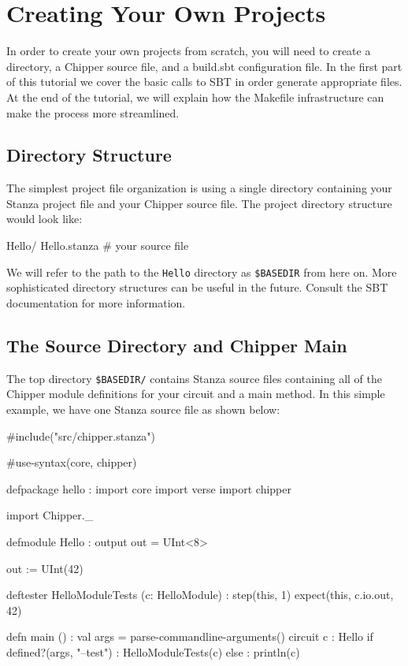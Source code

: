 \section{Creating Your Own Projects}

In order to create your own projects from scratch, you will need to create a directory, a Chipper source file, and a build.sbt configuration file. In the first part of this tutorial we cover the basic calls to SBT in order generate appropriate files. At the end of the tutorial, we will explain how the Makefile infrastructure can make the process more streamlined.

\subsection{Directory Structure}

The simplest project file organization is using a single directory containing your Stanza project file and your Chipper source file.  The project directory structure would look like:

\begin{bash}
Hello/
  Hello.stanza # your source file
\end{bash}

We will refer to the path to the \verb+Hello+ directory as \verb+$BASEDIR+ from here on.  More sophisticated directory structures can be useful in the future.  Consult the SBT documentation for more information.

\subsection{The Source Directory and Chipper Main}

The top directory \verb+$BASEDIR/+ contains Stanza source files containing all of the Chipper module definitions for your circuit and a main method.  In this simple example, we have one Stanza source file as shown below:

\begin{stanza}
#include("src/chipper.stanza")

#use-syntax(core, chipper)

defpackage hello :
   import core
   import verse
   import chipper

import Chipper._

defmodule Hello :
  output out = UInt<8>

  out := UInt(42)

deftester HelloModuleTests (c: HelloModule) :
  step(this, 1)
  expect(this, c.io.out, 42)

defn main () :
  val args = parse-commandline-arguments()
  circuit c : Hello
  if defined?(args, "--test") :
    HelloModuleTests(c)
  else :
    println(c)     
\end{stanza}


